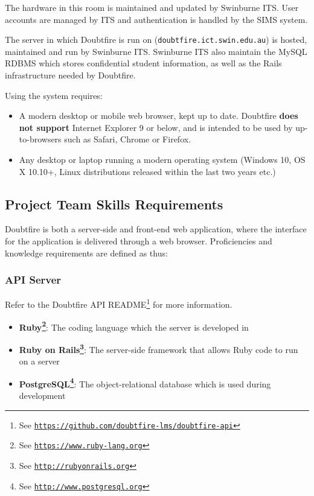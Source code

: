 \documentclass[12pt,a4paper,]{article}
\renewcommand{\href}[2]{#2\footnote{See \texttt{\url{#1}}}}
\providecommand{\tightlist}{%
  \setlength{\itemsep}{0pt}\setlength{\parskip}{0pt}}
\begin{document}
The hardware in this room is maintained and updated by Swinburne ITS.
User accounts are managed by ITS and authentication is handled by the
SIMS system.

The server in which Doubtfire is run on
(\texttt{doubtfire.ict.swin.edu.au}) is hosted, maintained and run by
Swinburne ITS. Swinburne ITS also maintain the MySQL RDBMS which stores
confidential student information, as well as the Rails infrastructure
needed by Doubtfire.

Using the system requires:

\begin{itemize}
\tightlist
\item
  A modern desktop or mobile web browser, kept up to date. Doubtfire
  \textbf{does not support} Internet Explorer 9 or below, and is
  intended to be used by up-to-browsers such as Safari, Chrome or
  Firefox.
\item
  Any desktop or laptop running a modern operating system (Windows 10,
  OS X 10.10+, Linux distributions released within the last two years
  etc.)
\end{itemize}

\subsection{Project Team Skills
Requirements}\label{project-team-skills-requirements}

Doubtfire is both a server-side and front-end web application, where the
interface for the application is delivered through a web browser.
Proficiencies and knowledge requirements are defined as thus:

\subsubsection{API Server}\label{api-server}

Refer to the Doubtfire API
\href{https://github.com/doubtfire-lms/doubtfire-api}{README} for more
information.

\begin{itemize}
\tightlist
\item
  \textbf{\href{https://www.ruby-lang.org}{Ruby}}: The coding language
  which the server is developed in
\item
  \textbf{\href{http://rubyonrails.org}{Ruby on Rails}}: The server-side
  framework that allows Ruby code to run on a server
\item
  \textbf{\href{http://www.postgresql.org}{PostgreSQL}}: The
  object-relational database which is used during development
\end{itemize}
\end{document}
